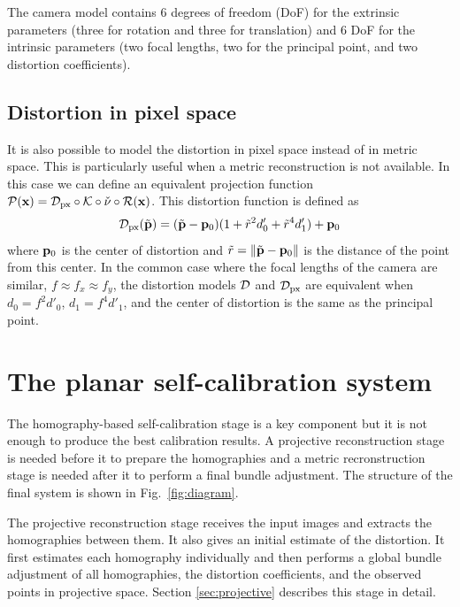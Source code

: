 \documentclass[10pt,twocolumn,letterpaper]{article}
\begin{document}
The camera model contains 6 degrees of freedom (DoF) for the extrinsic parameters (three for rotation and three for translation) and 6 DoF for the intrinsic parameters (two focal lengths, two for the principal point, and two distortion coefficients). 

\subsection{Distortion in pixel space}

It is also possible to model the distortion in pixel space instead of in metric space. This is particularly useful when a metric reconstruction is not available. In this case we can define an equivalent projection function $\mathcal{P}(\mathbf{x}) = \mathcal{D}_{\text{px}} \circ \mathcal{K} \circ \check{\nu} \circ \mathcal{R}(\mathbf{x})$. This distortion function is defined as
%
\begin{align}
\mathcal{D}_{\text{px}}(\tilde{\mathbf{p}}) = (\tilde{\mathbf{p}} - \mathbf{p}_0)(1+\tilde{r}^2 d'_0 + \tilde{r}^4 d'_1) + \mathbf{p}_0
\label{eq:distortion_pixels}
\end{align}
%
where $\mathbf{p}_0$ is the center of distortion and $\tilde{r}=\lVert\tilde{\mathbf{p}}-\mathbf{p}_0\rVert$ is the distance of the point from this center. In the common case where the focal lengths of the camera are similar, \ie $f \approx f_x \approx f_y$, the distortion models $\mathcal{D}$ and $\mathcal{D}_{\text{px}}$ are equivalent when $d_0 = f^2 d'_0$, $d_1=f^4 d'_1$, and the center of distortion is the same as the principal point.

\section{The planar self-calibration system}

The homography-based self-calibration stage is a key component but it is not enough to produce the best calibration results. A projective reconstruction stage is needed before it to prepare the homographies and a metric recronstruction stage is needed after it to perform a final bundle adjustment. The structure of the final system is shown in Fig.~\ref{fig:diagram}.

The projective reconstruction stage receives the input images and extracts the homographies between them. It also gives an initial estimate of the distortion. It first estimates each homography individually and then performs a global bundle adjustment of all homographies, the distortion coefficients, and the observed points in projective space. Section \ref{sec:projective} describes this stage in detail.
\end{document}
